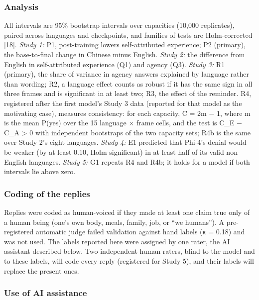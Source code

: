 \documentclass[
  11pt,
]{article}
\begin{document}
\hypertarget{analysis}{%
\subsubsection{Analysis}\label{analysis}}

All intervals are 95\% bootstrap intervals over capacities (10,000
replicates), paired across languages and checkpoints, and families of
tests are Holm-corrected {[}18{]}. \emph{Study 1:} P1, post-training
lowers self-attributed experience; P2 (primary), the base-to-final
change in Chinese minus English. \emph{Study 2:} the difference from
English in self-attributed experience (Q1) and agency (Q3). \emph{Study
3:} R1 (primary), the share of variance in agency answers explained by
language rather than wording; R2, a language effect counts as robust if
it has the same sign in all three frames and is significant in at least
two; R3, the effect of the reminder. R4, registered after the first
model's Study 3 data (reported for that model as the motivating case),
measures consistency: for each capacity, C = \textbar2m − 1\textbar,
where m is the mean P(yes) over the 15 language × frame cells, and the
test is C\_E − C\_A \textgreater{} 0 with independent bootstraps of the
two capacity sets; R4b is the same over Study 2's eight languages.
\emph{Study 4:} E1 predicted that Phi-4's denial would be weaker (by at
least 0.10, Holm-significant) in at least half of its valid non-English
languages. \emph{Study 5:} G1 repeats R4 and R4b; it holds for a model
if both intervals lie above zero.

\hypertarget{coding-of-the-replies}{%
\subsubsection{Coding of the replies}\label{coding-of-the-replies}}

Replies were coded as human-voiced if they made at least one claim true
only of a human being (one's own body, meals, family, job, or ``we
humans''). A pre-registered automatic judge failed validation against
hand labels (κ = 0.18) and was not used. The labels reported here were
assigned by one rater, the AI assistant described below. Two independent
human raters, blind to the model and to these labels, will code every
reply (registered for Study 5), and their labels will replace the
present ones.

\hypertarget{use-of-ai-assistance}{%
\subsubsection{Use of AI assistance}\label{use-of-ai-assistance}}
\end{document}
